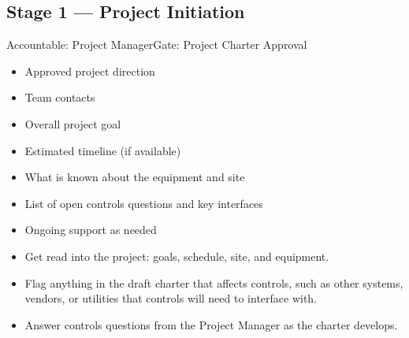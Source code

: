 \subsection{Stage 1 --- Project Initiation}
\begin{stagecard}{Accountable: Project Manager}{Gate: Project Charter Approval}
\tcbline
\begin{minipage}[t]{0.485\linewidth}
\begin{itemize}[leftmargin=*,itemsep=1pt,topsep=2pt]
  \item Approved project direction
  \item Team contacts
  \item Overall project goal
  \item Estimated timeline (if available)
  \item What is known about the equipment and site
\end{itemize}
\end{minipage}\hfill
\begin{minipage}[t]{0.485\linewidth}
\begin{itemize}[leftmargin=*,itemsep=1pt,topsep=2pt]
  \item List of open controls questions and key interfaces
  \item Ongoing support as needed
\end{itemize}
\end{minipage}
\tcbline
{}
\begin{itemize}[leftmargin=*,itemsep=1pt,topsep=2pt]
  \item Get read into the project: goals, schedule, site, and equipment.
  \item Flag anything in the draft charter that affects controls, such as other systems, vendors, or utilities that controls will need to interface with.
  \item Answer controls questions from the Project Manager as the charter develops.
\end{itemize}

\end{stagecard}
